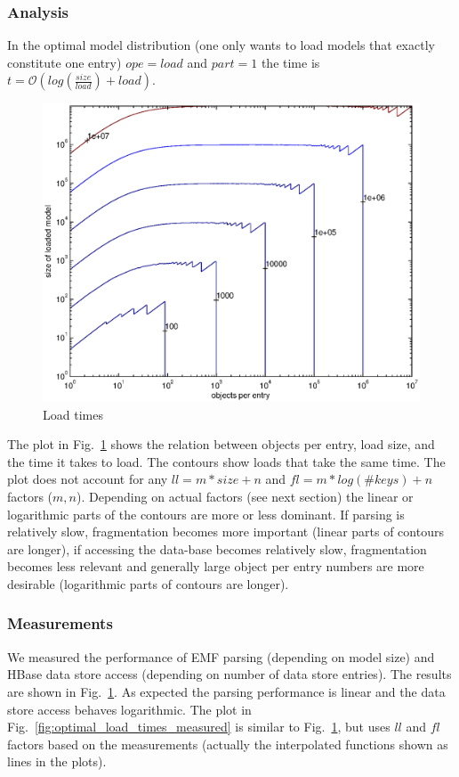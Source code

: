 \subsubsection{Analysis}
In the optimal model distribution (one only wants to load models that exactly constitute one entry) $ope=load$ and $part=1$ the time is $t=\mathcal{O}\left(log(\frac{size}{load})+load\right)$.

\begin{figure}
  \centering
  \includegraphics[width=0.65\linewidth]{figures/optimal_load_times}
  \caption{Load times}
  \label{fig:optimal_load_times}
\end{figure}

The plot in Fig.~\ref{fig:optimal_load_times} shows the relation between objects per entry, load size, and the time it takes to load. The contours show loads that take the same time. The plot does not account for any $ll=m*size+n$ and $fl=m*log(\#keys)+n$ factors ($m,n$). Depending on actual factors (see next section) the linear or logarithmic parts of the contours are more or less dominant. If parsing is relatively slow, fragmentation becomes more important (linear parts of contours are longer), if accessing the data-base becomes relatively slow, fragmentation becomes less relevant and generally large object per entry numbers are more desirable (logarithmic parts of contours are longer).

\subsubsection{Measurements}

We measured the performance of EMF parsing (depending on model size) and HBase data store access (depending on number of data store entries). The results are shown in Fig.~\ref{fig:optimal_load_times}. As expected the parsing performance is linear and the data store access behaves logarithmic. The plot in Fig.~\ref{fig:optimal_load_times_measured} is similar to Fig.~\ref{fig:optimal_load_times}, but uses $ll$ and $fl$ factors based on the measurements (actually the interpolated functions shown as lines in the plots).  

